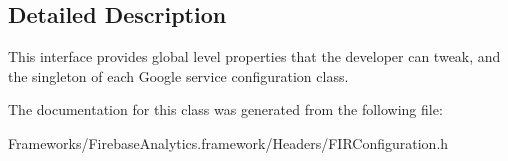 \subsection{Detailed Description}
This interface provides global level properties that the developer can tweak, and the singleton of each Google service configuration class. 

The documentation for this class was generated from the following file\+:\begin{DoxyCompactItemize}
\item 
Frameworks/\+Firebase\+Analytics.\+framework/\+Headers/F\+I\+R\+Configuration.\+h\end{DoxyCompactItemize}
